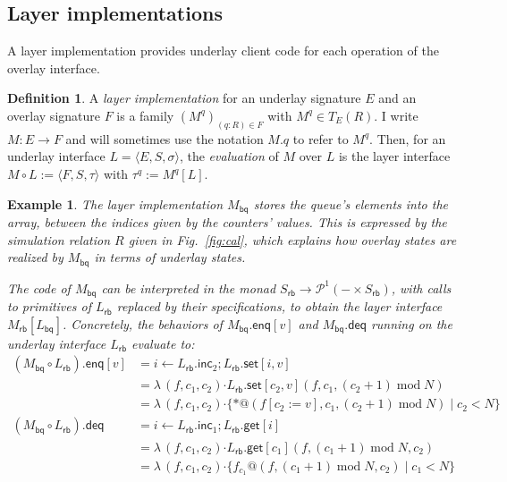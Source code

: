 \documentclass[11pt,oneside,draft]{book}
\newtheorem{example}[theorem]{Example}
\theoremstyle{definition}
\newtheorem{definition}[theorem]{Definition}
\newcommand{\kw}[1]{\ensuremath{ \mathsf{#1} }}
\newcommand{\bdot}{\boldsymbol{\cdot}}
\begin{document}

\subsection{Layer implementations} %

A layer implementation provides underlay client code
for each operation of the overlay interface.

\begin{definition}
A \emph{layer implementation}
for an underlay signature $E$ and
an overlay signature $F$
is a family $(M^q)_{(q \mathop: R) \in F}$
with $M^q \in T_E(R)$.
I write $M : E \rightarrow F$ and
will sometimes use the notation $M.q$
to refer to $M^q$.
Then,
for an underlay interface $L = \langle E, S, \sigma \rangle$,
the \emph{evaluation} of $M$ over $L$ is
the layer interface
$
  M \circ L := \langle F, S, \tau \rangle
$
with $\tau^q := M^q[L]$.
\end{definition}

\begin{example} \label{ex:bqimpl} %
The layer implementation $M_\kw{bq}$ 
stores the queue's elements into the array,
between the indices given by the counters' values.
This is expressed by the simulation relation $R$
given in Fig.~\ref{fig:cal},
which explains how overlay states are realized by $M_\kw{bq}$ 
in terms of underlay states.

The code of $M_\kw{bq}$ can be interpreted in the monad
$
    S_\kw{rb} \rightarrow \mathcal{P}^1(- \times S_\kw{rb})
$,
with calls to primitives of $L_\kw{rb}$
replaced by their specifications,
to obtain the layer interface $M_\kw{rb}[L_\kw{bq}]$.
Concretely,
the behaviors of $M_\kw{bq}.\kw{enq}[v]$ and $M_\kw{bq}.\kw{deq}$
running on the underlay interface $L_\kw{rb}$
evaluate to:
\begin{align*}
  (M_\kw{bq} \circ L_\kw{rb}).{\kw{enq}[v]}
    &= i \leftarrow L_\kw{rb}.\kw{inc}_2 \mathop{;}
        L_\kw{rb}.\kw{set}[i, v] \\
    &= \lambda \, (f, c_1, c_2) \bdot
       L_\kw{rb}.\kw{set}[c_2, v](f, c_1, (c_2+1) \mathop{\mathrm{mod}} N) \\
    &= \lambda \, (f, c_1, c_2) \bdot
       \{ *@(f[c_2 := v], c_1, (c_2+1) \mathop{\mathrm{mod}} N) \mid c_2 < N \}
  \\[1em]
  (M_\kw{bq} \circ L_\kw{rb}).\kw{deq}
    &= i \leftarrow L_\kw{rb}.\kw{inc}_1 \mathop{;}
        L_\kw{rb}.\kw{get}[i] \\
    &= \lambda \, (f, c_1, c_2) \bdot
       L_\kw{rb}.\kw{get}[c_1](f,
          (c_1 + 1) \mathop{\mathrm{mod}} N,
          c_2) \\
    &= \lambda \, (f, c_1, c_2) \bdot
       \{ f_{c_1}@(f, 
          (c_1 + 1) \mathop{\mathrm{mod}} N,
          c_2) \mid
          c_1 < N \}
\end{align*}
\end{example}
\end{document}
